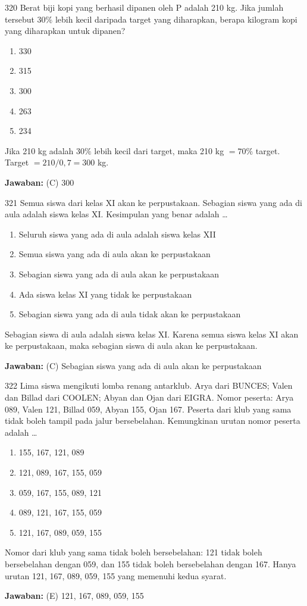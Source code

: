 \documentclass[11pt]{article}
\newenvironment{pil}{\begin{enumerate}[label=(\Alph*),leftmargin=*,itemsep=1pt,topsep=3pt]}{\end{enumerate}}
\newcommand{\jw}[1]{\par\smallskip\begin{jawbox}\textbf{Jawaban:} #1\end{jawbox}}
\begin{document}
\begin{soalbox}{3}{20}
Berat biji kopi yang berhasil dipanen oleh P adalah 210 kg. Jika jumlah tersebut $30\%$ lebih kecil daripada target yang diharapkan, berapa kilogram kopi yang diharapkan untuk dipanen?
\begin{pil}\item 330 \item 315 \item 300 \item 263 \item 234\end{pil}
\end{soalbox}
\begin{pembox}
Jika 210 kg adalah $30\%$ lebih kecil dari target, maka 210 kg $=70\%$ target. Target $=210/0{,}7=300$ kg.
\jw{(C) 300}
\end{pembox}

\begin{soalbox}{3}{21}
Semua siswa dari kelas XI akan ke perpustakaan. Sebagian siswa yang ada di aula adalah siswa kelas XI. Kesimpulan yang benar adalah \ldots
\begin{pil}\item Seluruh siswa yang ada di aula adalah siswa kelas XII \item Semua siswa yang ada di aula akan ke perpustakaan \item Sebagian siswa yang ada di aula akan ke perpustakaan \item Ada siswa kelas XI yang tidak ke perpustakaan \item Sebagian siswa yang ada di aula tidak akan ke perpustakaan\end{pil}
\end{soalbox}
\begin{pembox}
Sebagian siswa di aula adalah siswa kelas XI. Karena semua siswa kelas XI akan ke perpustakaan, maka sebagian siswa di aula akan ke perpustakaan.
\jw{(C) Sebagian siswa yang ada di aula akan ke perpustakaan}
\end{pembox}

\begin{soalbox}{3}{22}
Lima siswa mengikuti lomba renang antarklub. Arya dari BUNCES; Valen dan Billad dari COOLEN; Abyan dan Ojan dari EIGRA. Nomor peserta: Arya 089, Valen 121, Billad 059, Abyan 155, Ojan 167. Peserta dari klub yang sama tidak boleh tampil pada jalur bersebelahan. Kemungkinan urutan nomor peserta adalah \ldots
\begin{pil}\item 155, 167, 121, 089 \item 121, 089, 167, 155, 059 \item 059, 167, 155, 089, 121 \item 089, 121, 167, 155, 059 \item 121, 167, 089, 059, 155\end{pil}
\end{soalbox}
\begin{pembox}
Nomor dari klub yang sama tidak boleh bersebelahan: 121 tidak boleh bersebelahan dengan 059, dan 155 tidak boleh bersebelahan dengan 167. Hanya urutan 121, 167, 089, 059, 155 yang memenuhi kedua syarat.
\jw{(E) 121, 167, 089, 059, 155}
\end{pembox}
\end{document}
